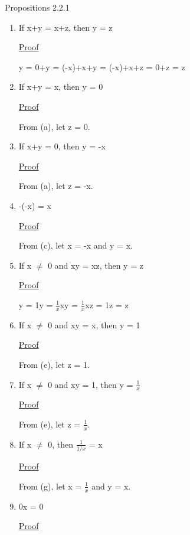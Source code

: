{ \color{blue} Propositions 2.2.1 }
	\begin{enumerate}[label=(\alph*), leftmargin=2cm, itemsep=0.1cm]
		\item If x+y = x+z, then y = z

			{ \color{magenta} \underline{Proof}  }
		
				y = 0+y = (-x)+x+y = (-x)+x+z = 0+z = z
			
\newpage
	
		\item If x+y = x, then y = 0

			{ \color{magenta} \underline{Proof} }

				From (a), let z = 0.
	
		\item If x+y = 0, then y = -x
	
			{ \color{magenta} \underline{Proof} }

				From (a), let z = -x.
	
		\item -(-x) = x

			{ \color{magenta} \underline{Proof} }

				From (c), let x = -x and y = x.
	
		\item If x $\not =$ 0 and xy = xz, then y = z

			{ \color{magenta} \underline{Proof} } 
		
				y = 1y = $\frac{1}{x}$xy = $\frac{1}{x}$xz = 1z = z 
	
		\item If x $\not =$ 0 and xy = x, then y = 1

			{ \color{magenta} \underline{Proof} } 
		
				From (e), let z = 1.
	
		\item If x $\not =$ 0 and xy = 1, then y = $\frac{1}{x}$

			{ \color{magenta} \underline{Proof} } 
		
				From (e), let z = $\frac{1}{x}$.
	
		\item If x $\not =$ 0, then $\frac{1}{1/x}$ = x

			{ \color{magenta} \underline{Proof} } 
		
				From (g), let x = $\frac{1}{x}$ and y = x.
	
		\item 0x = 0

			{ \color{magenta} \underline{Proof} } 
		

\end{enumerate}
